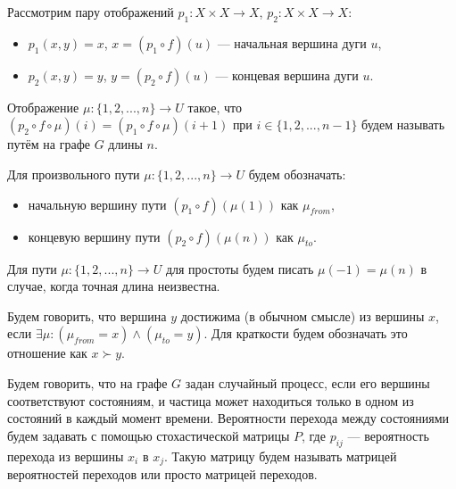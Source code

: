 \begin{definition}
	Рассмотрим пару отображений $p_1:X \times X\to X$, $p_2:X \times X\to X$:
	\begin{itemize}
		\item $p_1(x, y) = x$, $x = (p_1 \circ f)(u)$ --- начальная вершина дуги $u$,
		\item $p_2(x, y) = y$, $y = (p_2 \circ f)(u)$ --- концевая вершина дуги $u$.
	\end{itemize}
\end{definition}

\begin{definition}
	Отображение $\mu:\{1, 2, ... , n\} \to U$ такое, что 
	$(p_2 \circ f \circ \mu)(i) = (p_1 \circ f \circ \mu)(i + 1)$ при $i \in \{1, 2, ... , n-1\}$
	будем называть путём на графе $G$ длины $n$.
\end{definition}

\begin{definition}
	Для произвольного пути $\mu:\{1, 2, ... , n\} \to U$ будем обозначать:
	\begin{itemize}
		\item начальную вершину пути $(p_1 \circ f)(\mu(1))$ как $\mu_{from}$,
		\item концевую вершину пути $(p_2 \circ f)(\mu(n))$ как $\mu_{to}$.
	\end{itemize}
\end{definition}

\begin{definition}
	Для пути $\mu:\{1, 2, ... , n\} \to U$ для простоты будем писать $\mu(-1) = \mu(n)$ в случае, когда точная длина неизвестна. 
\end{definition}

\begin{definition}
	Будем говорить, что вершина $y$ достижима (в обычном смысле) из вершины $x$, если $\exists \mu: (\mu_{from} = x) \wedge (\mu_{to} = y)$. Для краткости будем обозначать это отношение как $x \succ y$.
\end{definition}

\begin{definition}
	Будем говорить, что на графе $G$ задан случайный процесс, если его вершины соответствуют состояниям, и частица может находиться только в одном из состояний в каждый момент времени. Вероятности перехода между состояниями будем задавать с помощью стохастической матрицы $P$, где $p_{ij}$ --- вероятность перехода из вершины $x_i$ в $x_j$. Такую матрицу будем называть матрицей вероятностей переходов или просто матрицей переходов.
\end{definition}

